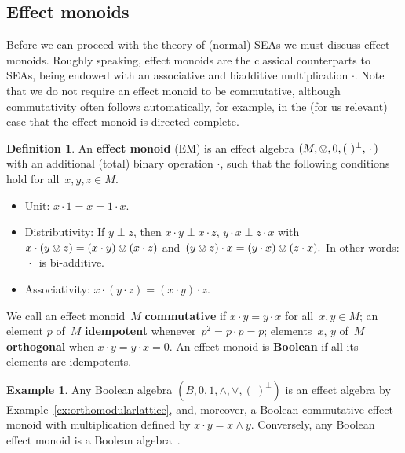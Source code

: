 \documentclass[a4paper, onecolumn, accepted=2020-12-22]{quantumarticle}
\newcommand\Define[1]{\textbf{#1}}
\newcounter{counter}
\theoremstyle{definition}
\newtheorem{definition}[counter]{Definition}
\newtheorem{example}[counter]{Example}
\begin{document}
\subsection{Effect monoids}
Before we can proceed with the theory of (normal) SEAs
we must discuss effect monoids.
Roughly speaking, effect monoids are the classical counterparts
to SEAs, being endowed with an associative and biadditive 
multiplication $\cdot$.
Note that we do not require an effect monoid to be commutative,
although commutativity often follows automatically,
for example, in the (for us relevant) case that the effect monoid is
directed complete.
\begin{definition}\label{def:effectmonoid}
    An \Define{effect monoid} (EM) is an effect algebra $(M,\ovee, 0, (\ )^\perp,
    \,\cdot\,)$ with an additional (total) binary operation $\cdot$,
such that the following conditions hold 
    for all~$x,y,z \in M$.
\begin{itemize}
\item Unit: $x\cdot 1 = x = 1\cdot x$.
\item Distributivity: If $y\perp z$, then $x\cdot y\perp  x\cdot z$,\quad
    $y\cdot x\perp z\cdot x$
        with~$x\cdot (y\ovee z) = (x\cdot y) \ovee (x\cdot z)$
        and~$ (y\ovee z)\cdot x = (y\cdot x) \ovee (z\cdot x).$
In other words:
        $\,\cdot\,$ is bi-additive.
\item Associativity: $x \cdot (y\cdot z) = (x \cdot y) \cdot z$.
\end{itemize}
We call an effect monoid~$M$ \Define{commutative} if $x\cdot y = y \cdot x$
    for all~$x,y \in M$;
an element $p$ of~$M$  \Define{idempotent}
whenever~$p^2 = p \cdot p = p$;
elements~$x$, $y$  of~$M$ \Define{orthogonal}
when $x\cdot y = y\cdot x = 0$.
    An effect monoid is \Define{Boolean}
        if all its elements are idempotents.

\end{definition}

\begin{example}\label{ex:booleanalgebra}
Any Boolean algebra  $(B,0,1,\wedge,\vee,(\ )^\perp)$
    is an effect algebra by Example~\ref{ex:orthomodularlattice},
and, moreover,  a Boolean commutative effect monoid with
    multiplication defined by $x \cdot y= x \wedge y$.
    Conversely, any Boolean effect monoid is a Boolean algebra~\cite[Proposition~47]{first}.
\end{example}
\end{document}
